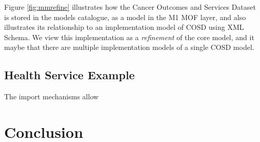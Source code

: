 \documentclass{llncs}
\begin{document}
	Figure \ref{fig:mmrefine} illustrates how the Cancer Outcomes and Services Dataset is stored in the models catalogue, as a model in the M1 MOF layer, and also illustrates its relationship to an implementation model of COSD using XML Schema. We view this implementation as a \emph{refinement} of the core model, and it maybe that there are multiple implementation models of a single COSD model.
	
	
	\subsection{Health Service Example}
 	The import mechanisms allow 
	
	
	\section{Conclusion}
	
	
	
	
	
	
\end{document}
